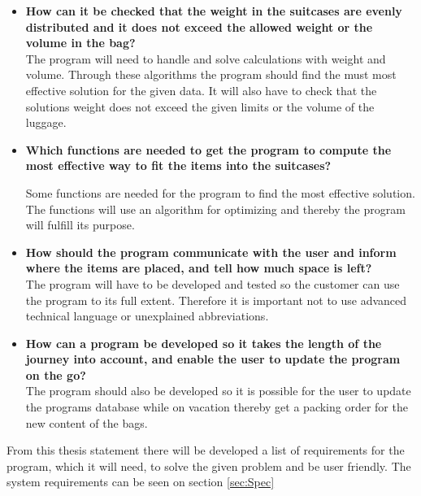 \begin{itemize}
\item \textbf{How can it be checked that the weight in the suitcases are evenly distributed and it does not exceed the allowed weight or the volume in the bag?}\\

The program will need to handle and solve calculations with weight and volume. Through these algorithms the program should find the must most effective solution for the given data. It will also have to check that the solutions weight does not exceed the given limits or the volume of the luggage.

\item \textbf{Which functions are needed to get the program to compute the most effective way to fit the items into the suitcases?}\newline

Some functions are needed for the program to find the most effective solution. The functions will use an algorithm for optimizing and thereby the program will fulfill its purpose.

\item \textbf{How should the program communicate with the user and inform where the items are placed, and tell how much space is left?}\\

The program will have to be developed and tested so the customer can use the program to its full extent. Therefore it is important not to use advanced technical language or unexplained abbreviations.

\item \textbf{How can a program be developed so it takes the length of the journey  into account, and enable the user to update the program on the go?}\\

The program should also be developed so it is possible for the user to update the programs database while on vacation thereby get a packing order for the new content of the bags.
\end{itemize}

From this thesis statement there will be developed a list of requirements for the program, which it will need, to solve the given problem and be user friendly. The system requirements can be seen on section \ref{sec:Spec}
